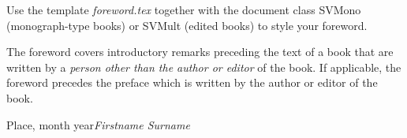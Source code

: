 %
%

\foreword

Use the template \textit{foreword.tex} together with the document class SVMono (monograph-type books) or SVMult (edited books) to style your foreword. 

The foreword covers introductory remarks preceding the text of a book that are written by a \textit{person other than the author or editor} of the book. If applicable, the foreword precedes the preface which is written by the author or editor of the book.


\vspace{\baselineskip}
\begin{flushright}\noindent
Place, month year\hfill {\it Firstname  Surname}\\
\end{flushright}

